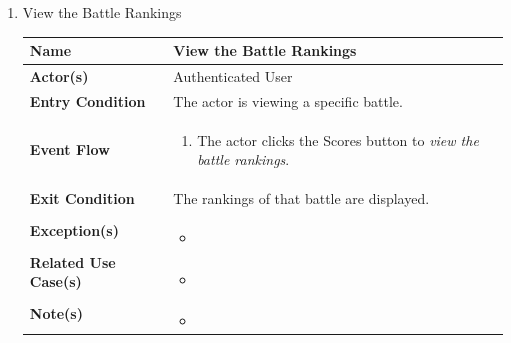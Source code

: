\begin{enumerate}
\item View the Battle Rankings
\begin{center}
    \begin{tabular}{ | m{10em} | m{10cm}| } 
      \hline
      \textbf{Name} & View the Battle Rankings \\ 
      \hline
      \textbf{Actor(s)} & Authenticated User \\ 
      \hline
      \textbf{Entry Condition} & The actor is viewing a specific battle. \\ 
      \hline
      \textbf{Event Flow} & 
          \begin{enumerate}[(1)]
              \item The actor clicks the Scores button to \textit{view the battle rankings}.
          \end{enumerate}
      \\ 
      \hline
      \textbf{Exit Condition} & The rankings of that battle are displayed.  \\ 
      \hline
      \textbf{Exception(s)} & 
      \begin{itemize}
          \item 
      \end{itemize}
          \\ 
      \hline
      \textbf{Related Use Case(s)} & 
      \begin{itemize}
          \item 
      \end{itemize}
          \\ 
      \hline
      \textbf{Note(s)} & 
      \begin{itemize}
          \item 
      \end{itemize}
          \\ 
      \hline
    \end{tabular}
\end{center}



\end{enumerate}
